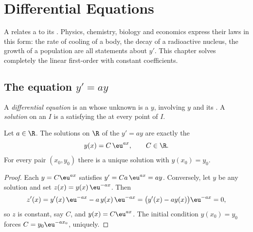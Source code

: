 \chapter{Differential Equations}\label{ch:g12:diffeq}

A  relates a  to its . Physics,
chemistry, biology and economics express their laws in this form: the rate of
cooling of a body, the decay of a radioactive nucleus, the growth of a
population are all statements about $y'$. This chapter solves completely the
linear first-order  with constant coefficients.

\section{The equation \texorpdfstring{$y' = ay$}{y' = ay}}

\begin{definition}\label{def:g12:diffeq:ode}
A \emph{differential equation} is an 
whose unknown is a  $y$, involving $y$ and its . A
\emph{solution} on an  $I$ is a   satisfying
the  at every point of $I$.
\end{definition}

\begin{theorem}[Solutions of $y' = ay$]\label{thm:g12:diffeq:homogeneous}
Let $a \in \R$. The solutions on $\R$ of the  $y' = ay$ are exactly
the 
\[
y(x) = C\,\eu^{ax}, \qquad C \in \R .
\]
For every pair $(x_0, y_0)$ there is a unique solution with
$y(x_0) = y_0$.
\end{theorem}

\begin{proof}
Each $y = C\eu^{ax}$ satisfies $y' = Ca\,\eu^{ax} = ay$. Conversely, let $y$
be any solution and set $z(x) = y(x)\,\eu^{-ax}$. Then
\[
z'(x) = y'(x)\,\eu^{-ax} - a\,y(x)\,\eu^{-ax}
= \bigl(y'(x) - a y(x)\bigr)\eu^{-ax} = 0,
\]
so $z$ is constant, say $C$, and $y(x) = C\eu^{ax}$. The initial condition
$y(x_0) = y_0$ forces $C = y_0 \eu^{-a x_0}$, uniquely.
\end{proof}

